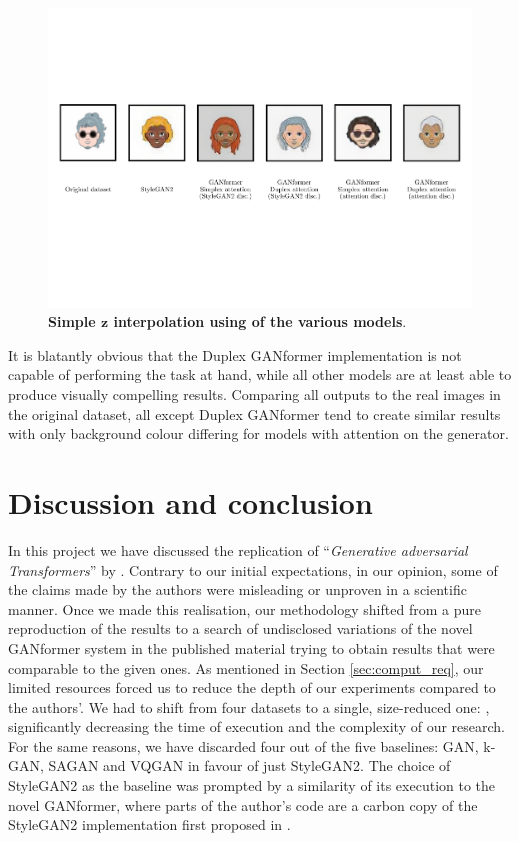 \documentclass{article}
\begin{document}
	\begin{figure}[htb]
		\centering
		\includegraphics[width=.9\linewidth]{imgAll}
		\caption{\textbf{Simple $\mathbf{z}$ interpolation using of the various models}.} 
		\label{fig:summaryImgs}
	\end{figure}
	
	It is blatantly obvious that the Duplex GANformer implementation is not capable of performing the 
	task at hand, while all other models are at least able to produce visually compelling results.
	Comparing all outputs to the real images in the original dataset, all except Duplex GANformer tend to 
	create similar results with only background colour differing for models with attention on the 
	generator.
	
	\section{Discussion and conclusion}
	
	In this project we have discussed the replication of ``\emph{Generative adversarial Transformers}'' 
	by 
	\citet{hudson2021generative}.
	Contrary to our initial expectations, in our opinion, some of the claims made by the authors were 
	misleading or unproven in a scientific manner.
	Once we made this realisation, our methodology shifted from a pure reproduction of the results to a 
	search of undisclosed variations of the novel GANformer system in the published material trying to 
	obtain 
	results that were comparable to the given ones.
	As mentioned in Section \ref{sec:comput_req}, our limited resources forced us to reduce the depth 
	of our experiments 
	compared to the authors'.
	We had to shift from four datasets to a single, size-reduced one: \citet{cartoonset}, significantly 
	decreasing the time of execution and the complexity of our research.
	For the same reasons, we have discarded four out of the five baselines: GAN, k-GAN, SAGAN and 
	VQGAN 
	in favour of just StyleGAN2.
	The choice of StyleGAN2 as the baseline was prompted by a similarity of its execution to the novel 
	GANformer, where parts of the author's code are a carbon copy of the StyleGAN2 implementation 
	first 
	proposed in \citet{karras2019style}.
	
\end{document}
